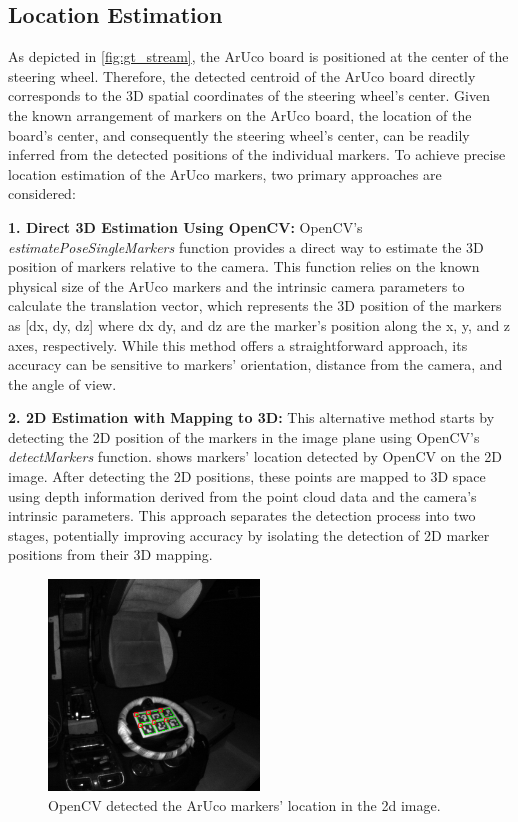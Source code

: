 \subsection{Location Estimation}
As depicted in \cref{fig:gt_stream}, the ArUco board is positioned at the center of the steering 
wheel. Therefore, the detected centroid of the ArUco board directly 
corresponds to the 3D spatial coordinates of the steering 
wheel's center. Given the known arrangement of markers on the 
ArUco board, the location of the board's center, and 
consequently the steering wheel's center, can be readily 
inferred from the detected positions of the individual markers.
To achieve precise location estimation of the ArUco markers, two primary approaches are considered:

\textbf{1. Direct 3D Estimation Using OpenCV: }
OpenCV’s \emph{estimatePoseSingleMarkers} function provides a direct 
way to estimate the 3D position of markers relative to the camera. 
This function relies on the known physical size of the 
ArUco markers and the intrinsic camera parameters to calculate 
the translation vector, which represents the 3D position of 
the markers as [dx, dy, dz] where dx dy, and dz are the marker's 
position along the x, y, and z axes, respectively. 
While this method offers a straightforward approach, its 
accuracy can be sensitive to markers' orientation, distance from 
the camera, and the angle of view.


\textbf{2. 2D Estimation with Mapping to 3D: }
This alternative method starts by detecting the 2D position of 
the markers in the image plane using OpenCV’s \emph{detectMarkers} 
function.  shows markers' location detected 
by OpenCV on the 2D image.
After detecting the 2D positions, these points are 
mapped to 3D space using depth information derived from the 
point cloud data and the camera’s intrinsic parameters. 
This approach separates the detection process into two stages, 
potentially improving accuracy by isolating the detection of 
2D marker positions from their 3D mapping.
\begin{figure}[htpb]
    \centering
    \includegraphics[width=0.5\textwidth]{media/chapter 5/aruco_detection.png}
    \caption{OpenCV detected the ArUco markers' location in the 2d image.}
    \label{fig:detectMarkers}
\end{figure}


